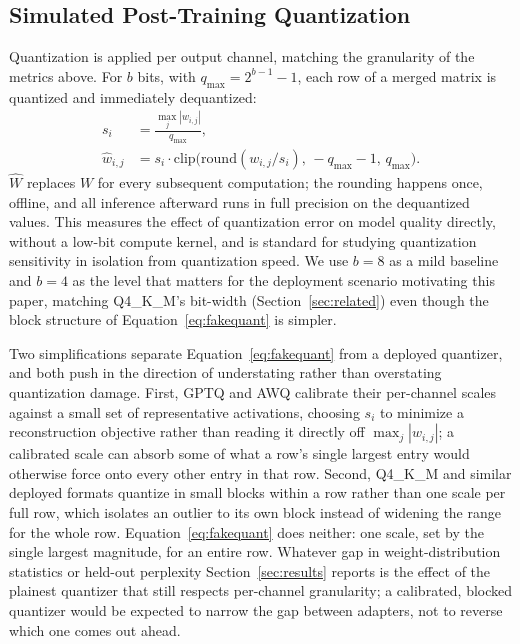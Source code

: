 \documentclass[conference]{IEEEtran}
\begin{document}
\subsection{Simulated Post-Training Quantization}

Quantization is applied per output channel, matching the granularity of the metrics above. For $b$ bits, with $q_{\max}=2^{b-1}-1$, each row of a merged matrix is quantized and immediately dequantized:
\begin{align}
s_i &= \frac{\max_j|w_{i,j}|}{q_{\max}}, \\
\hat{w}_{i,j} &= s_i\cdot\mathrm{clip}\!\big(\mathrm{round}(w_{i,j}/s_i),\,-q_{\max}{-}1,\,q_{\max}\big).
\label{eq:fakequant}
\end{align}
$\hat W$ replaces $W$ for every subsequent computation; the rounding happens once, offline, and all inference afterward runs in full precision on the dequantized values. This measures the effect of quantization error on model quality directly, without a low-bit compute kernel, and is standard for studying quantization sensitivity in isolation from quantization speed. We use $b=8$ as a mild baseline and $b=4$ as the level that matters for the deployment scenario motivating this paper, matching Q4\_K\_M's bit-width (Section~\ref{sec:related}) even though the block structure of Equation~\ref{eq:fakequant} is simpler.

Two simplifications separate Equation~\ref{eq:fakequant} from a deployed quantizer, and both push in the direction of understating rather than overstating quantization damage. First, GPTQ and AWQ calibrate their per-channel scales against a small set of representative activations, choosing $s_i$ to minimize a reconstruction objective rather than reading it directly off $\max_j|w_{i,j}|$; a calibrated scale can absorb some of what a row's single largest entry would otherwise force onto every other entry in that row. Second, Q4\_K\_M and similar deployed formats quantize in small blocks within a row rather than one scale per full row, which isolates an outlier to its own block instead of widening the range for the whole row. Equation~\ref{eq:fakequant} does neither: one scale, set by the single largest magnitude, for an entire row. Whatever gap in weight-distribution statistics or held-out perplexity Section~\ref{sec:results} reports is the effect of the plainest quantizer that still respects per-channel granularity; a calibrated, blocked quantizer would be expected to narrow the gap between adapters, not to reverse which one comes out ahead.
\end{document}
